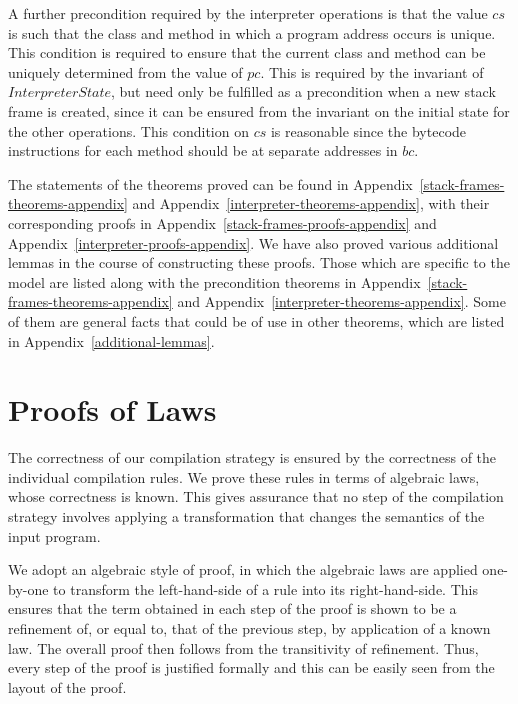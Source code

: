 A further precondition required by the interpreter operations is that
the value $cs$ is such that the class and method in which a program
address occurs is unique.
This condition is required to ensure that the current class and method
can be uniquely determined from the value of $pc$.
This is required by the invariant of $InterpreterState$, but need only
be fulfilled as a precondition when a new stack frame is created,
since it can be ensured from the invariant on the initial state for
the other operations.
This condition on $cs$ is reasonable since the bytecode instructions
for each method should be at separate addresses in $bc$.

The statements of the theorems proved can be found in
Appendix~\ref{stack-frames-theorems-appendix} and
Appendix~\ref{interpreter-theorems-appendix}, with their corresponding
proofs in Appendix~\ref{stack-frames-proofs-appendix} and
Appendix~\ref{interpreter-proofs-appendix}.
We have also proved various additional lemmas in the course of
constructing these proofs.
Those which are specific to the model are listed along with the
precondition theorems in Appendix~\ref{stack-frames-theorems-appendix}
and Appendix~\ref{interpreter-theorems-appendix}.
Some of them are general facts that could be of use in other theorems,
which are listed in Appendix~\ref{additional-lemmas}.

\section{Proofs of Laws}
\label{proofs-of-laws-section}

The correctness of our compilation strategy is ensured by the
correctness of the individual compilation rules.
We prove these rules in terms of algebraic laws, whose correctness is
known.
This gives assurance that no step of the compilation strategy involves
applying a transformation that changes the semantics of the input
program.

We adopt an algebraic style of proof, in which the algebraic laws are
applied one-by-one to transform the left-hand-side of a rule into its
right-hand-side.
This ensures that the term obtained in each step of the proof is shown
to be a refinement of, or equal to, that of the previous step, by
application of a known law.
The overall proof then follows from the transitivity of refinement.
Thus, every step of the proof is justified formally and this can be
easily seen from the layout of the proof.


